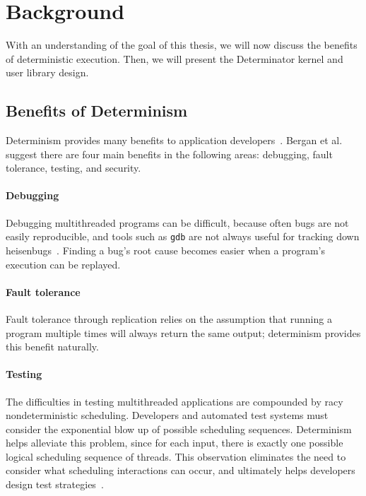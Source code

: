 
\section{Background}

With an understanding of the goal of this thesis, we will now discuss the
benefits of deterministic execution. Then, we will present the Determinator
kernel and user library design.

\subsection{Benefits of Determinism}

Determinism provides many benefits to application
developers~\cite{Bergan11,olszewski2009kendo,bocchino2009parallel}. Bergan et
al. suggest there are four main benefits in
the following areas: debugging, fault tolerance, testing, and security.

\paragraph{Debugging} Debugging multithreaded programs can be difficult, because
often bugs are not easily reproducible, and tools such as {\tt gdb} are not
always useful for tracking down heisenbugs~\cite{Musuvathi08}. Finding a bug's
root cause becomes easier when a program's execution can be replayed.

\paragraph{Fault tolerance} Fault tolerance through replication relies
on the assumption that running a program multiple times will always return the
same output; determinism provides this benefit naturally.

\paragraph{Testing} The difficulties in testing multithreaded applications are
compounded by racy nondeterministic scheduling. Developers and automated test
systems must consider the exponential blow up of possible scheduling sequences.
Determinism helps alleviate this problem, since for each input, there is exactly
one possible logical scheduling sequence of threads. This observation eliminates
the need to consider what scheduling interactions can occur, and ultimately
helps developers design test strategies~\cite{Bergan11}.

